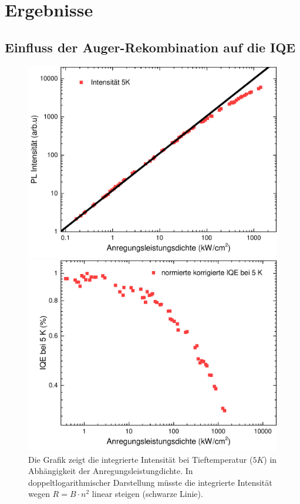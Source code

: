 \chapter{Ergebnisse}
\section{Einfluss der Auger-Rekombination auf die IQE}
\label{chap:auger}
\thispagestyle{fancy}
%
\begin{figure}[ht]
    \centering
    \begin{minipage}[t]{0.49\linewidth}
        \centering
        \includegraphics[width=\linewidth]{Bilder/AugerBei5K.pdf}
        \caption{Die Grafik zeigt die integrierte Intensität bei Tieftemperatur ($5 K$) in Abhängigkeit der Anregungsleistungdichte. In doppeltlogarithmischer Darstellung müsste die integrierte Intensität wegen $R = B \cdot n^2$ linear steigen (schwarze Linie).}
        \label{fig:auger5k}
    \end{minipage}%
    \hfill
    \begin{minipage}[t]{0.49\linewidth}
        \centering
        \includegraphics[width=\linewidth]{Bilder/NormierteKorrgierteIQE5K.pdf}

\end{minipage}
\end{figure}
